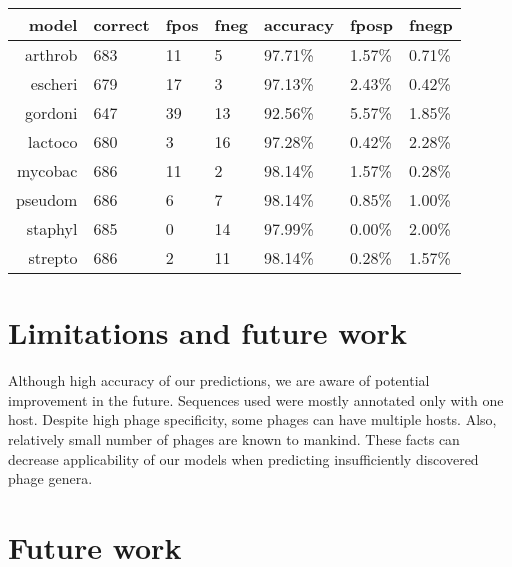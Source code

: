 \begin{tabular}{ r l l l l l l }
\hline
model & correct & fpos & fneg & accuracy & fposp & fnegp \\
\hline
arthrob & 683 & 11 & 5  & 97.71\% & 1.57\% & 0.71\% \\
escheri & 679 & 17 & 3  & 97.13\% & 2.43\% & 0.42\% \\
gordoni & 647 & 39 & 13 & 92.56\% & 5.57\% & 1.85\% \\
lactoco & 680 & 3  & 16 & 97.28\% & 0.42\% & 2.28\% \\
mycobac & 686 & 11 & 2  & 98.14\% & 1.57\% & 0.28\% \\
pseudom & 686 & 6  & 7  & 98.14\% & 0.85\% & 1.00\% \\
staphyl & 685 & 0  & 14 & 97.99\% & 0.00\% & 2.00\% \\
strepto & 686 & 2  & 11 & 98.14\% & 0.28\% & 1.57\% \\
\hline
\end{tabular}  

\section{Limitations and future work}
Although high accuracy of our predictions, we are aware of potential improvement in the future.
Sequences used were mostly annotated only with one host. Despite high phage specificity, some phages can have multiple hosts. Also, relatively small number of phages are known to mankind. These facts can decrease applicability of our models when predicting insufficiently discovered phage genera. 
\section{Future work}


